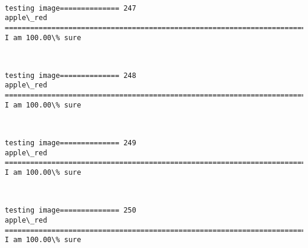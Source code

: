 \documentclass[11pt]{article}
\begin{document}
    \begin{center}
    \end{center}
    { \hspace*{\fill} \\}
    
    \begin{Verbatim}[commandchars=\\\{\}]
testing image============== 247
apple\_red
============================================================================
I am 100.00\% sure

    \end{Verbatim}

    \begin{center}
    \end{center}
    { \hspace*{\fill} \\}
    
    \begin{Verbatim}[commandchars=\\\{\}]
testing image============== 248
apple\_red
============================================================================
I am 100.00\% sure

    \end{Verbatim}

    \begin{center}
    \end{center}
    { \hspace*{\fill} \\}
    
    \begin{Verbatim}[commandchars=\\\{\}]
testing image============== 249
apple\_red
============================================================================
I am 100.00\% sure

    \end{Verbatim}

    \begin{center}
    \end{center}
    { \hspace*{\fill} \\}
    
    \begin{Verbatim}[commandchars=\\\{\}]
testing image============== 250
apple\_red
============================================================================
I am 100.00\% sure

    \end{Verbatim}
\end{document}
